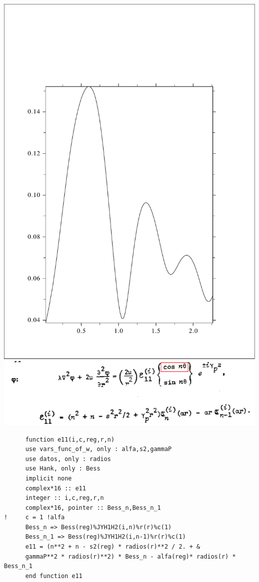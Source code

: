 \documentclass [11pt,spanish]{article}
\begin{document}
\includegraphics[scale=0.4]{RES_2s_tt2abspi.pdf}\includegraphics[scale=0.5]{e11}
\begingroup
\fontsize{10pt}{12pt}
\selectfont
{}
\begin{shaded}
\begin{verbatim}
      function e11(i,c,reg,r,n)
      use vars_func_of_w, only : alfa,s2,gammaP
      use datos, only : radios
      use Hank, only : Bess
      implicit none
      complex*16 :: e11
      integer :: i,c,reg,r,n
      complex*16, pointer :: Bess_n,Bess_n_1
!     c = 1 !alfa
      Bess_n => Bess(reg)%JYH1H2(i,n)%r(r)%c(1)
      Bess_n_1 => Bess(reg)%JYH1H2(i,n-1)%r(r)%c(1)
      e11 = (n**2 + n - s2(reg) * radios(r)**2 / 2. + & 
      gammaP**2 * radios(r)**2) * Bess_n - alfa(reg)* radios(r) * Bess_n_1
      end function e11
\end{verbatim}
\end{shaded}
\end{document}
